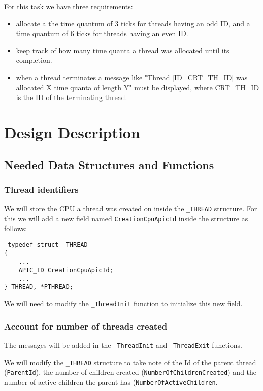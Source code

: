 \documentclass[a4paper,12pt]{report}
\begin{document}
For this task we have three requirements:
\begin{itemize}
    \item allocate a the time quantum of 3 ticks for threads having an odd ID, and a time quantum of 6 ticks for threads having an even ID. 
    \item keep track of how many time quanta a thread was allocated until its completion. 
    \item when a thread terminates a message like "Thread [ID=CRT\_TH\_ID] was allocated X time quanta of length Y" must be displayed, where CRT\_TH\_ID is the ID of the terminating thread.
\end{itemize}

\chapter{Design Description}

\section{Needed Data Structures and Functions}
\subsection{Thread identifiers}
We will store the CPU a thread was created on inside the \lstinline|_THREAD| structure. For this we will add a new field named \lstinline|CreationCpuApicId| inside the structure as follows:

\begin{lstlisting}
 typedef struct _THREAD
{
    ...
    APIC_ID CreationCpuApicId;
    ...
} THREAD, *PTHREAD;
\end{lstlisting}

We will need to modify the \lstinline|_ThreadInit| function to initialize this new field. 

\subsection{Account for number of threads created}

The messages will be added in the \lstinline|_ThreadInit| and \lstinline|_ThreadExit| functions. 

We will modify the \lstinline|_THREAD| structure to take note of the Id of the parent thread (\lstinline|ParentId|), the number of children created (\lstinline|NumberOfChildrenCreated|) and the number of active children the parent has (\lstinline|NumberOfActiveChildren|. 
\end{document}
